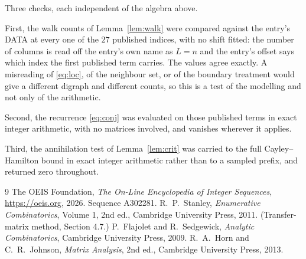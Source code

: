 \documentclass[11pt,a4paper]{article}
\theoremstyle{plain}
\theoremstyle{definition}
\begin{document}
Three checks, each independent of the algebra above.

First, the walk counts of Lemma~\ref{lem:walk} were compared against the entry's DATA at
every one of the $27$ published indices, with no shift fitted: the number of columns is
read off the entry's own name as $L=n$ and the entry's offset says which index the first
published term carries. The values agree exactly. A misreading of \eqref{eq:loc}, of the
neighbour set, or of the boundary treatment would give a different digraph and different
counts, so this is a test of the modelling and not only of the arithmetic.

Second, the recurrence \eqref{eq:conj} was evaluated on those published terms in exact
integer arithmetic, with no matrices involved, and vanishes wherever it applies.

Third, the annihilation test of Lemma~\ref{lem:crit} was carried to the full
Cayley--Hamilton bound in exact integer arithmetic rather than to a sampled prefix, and
returned zero throughout.

\begin{thebibliography}{9}
 The OEIS Foundation, \emph{The On-Line Encyclopedia of Integer
Sequences}, \url{https://oeis.org}, 2026. Sequence A302281.
 R.~P.~Stanley, \emph{Enumerative Combinatorics}, Volume 1, 2nd ed.,
Cambridge University Press, 2011. (Transfer-matrix method, Section 4.7.)
 P.~Flajolet and R.~Sedgewick, \emph{Analytic Combinatorics}, Cambridge
University Press, 2009.
 R.~A.~Horn and C.~R.~Johnson, \emph{Matrix Analysis}, 2nd ed., Cambridge
University Press, 2013.
\end{thebibliography}
\end{document}
